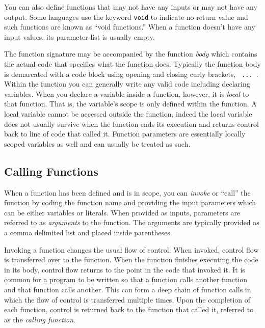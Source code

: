 You can also define functions that may not have any inputs or may not
have any output.  Some languages use the keyword \texttt{void} 
to indicate no return value and such functions are known as ``void 
functions.''  When a function doesn't have any input values, its parameter
list is usually empty.

The function signature may be accompanied by the function \emph{body}
which contains the actual code that specifies what the function does.  
Typically the function body is demarcated with a code block using 
opening and closing curly brackets, \texttt{{ ... }}.  Within the function you can generally
write any valid code including declaring variables.  When you declare a 
variable inside a function, however, it is  \emph{local} to that function.
That is, the variable's scope is only defined within the function.  A local
variable cannot be accessed outside the function, indeed the local
variable does not usually survive when the function ends its
execution and returns control back to line of code that called it. 
Function parameters are essentially locally scoped variables as well 
and can usually be treated as such.

\subsection{Calling Functions}

When a function has been defined and is in scope, you can \emph{invoke}
or ``call'' the function by coding the function name and providing the input
parameters which can be either variables or literals.  When
provided as inputs, parameters are referred to as \emph{arguments}
to the function.  The arguments are typically provided as a comma delimited
list and placed inside parentheses.  

Invoking a function changes the usual flow of control.  When invoked, control
flow is transferred over to the function.  When the function finishes executing the
code in its body, control flow returns to the point in the code that invoked it.
It is common for a program to be written so that a function calls another function
and that function calls another.  This can form a deep chain of function calls in 
which the flow of control is transferred multiple times.  Upon the completion
of each function, control is returned back to the function that called it, 
referred to as the \emph{calling function}.


